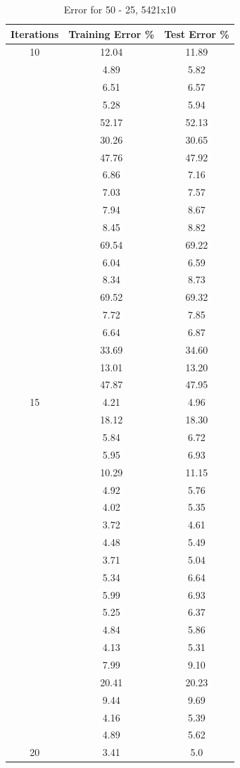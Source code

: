 \documentclass[12pt]{article}
\begin{document}
\begin{table}[h]
	\begin{center}
		\caption{Error for 50 - 25, 5421x10}
		\label{tab:table2}
		\begin{tabular}{|c|c|c|}
			\hline
			\textbf{Iterations} & \textbf{Training Error \%} & \textbf{Test Error \%} \\
			\hline
			10 & 12.04 & 11.89\\
			& 4.89 & 5.82\\
			& 6.51 & 6.57\\
			& 5.28 & 5.94\\
			& 52.17 & 52.13\\
			& 30.26 & 30.65\\
			& 47.76 & 47.92\\
			& 6.86 & 7.16\\
			& 7.03 & 7.57\\
			& 7.94 & 8.67\\
			& 8.45 & 8.82\\
			& 69.54 & 69.22\\
			& 6.04 & 6.59\\
			& 8.34 & 8.73\\
			& 69.52 & 69.32\\
			& 7.72 & 7.85\\
			& 6.64 & 6.87\\
			& 33.69 & 34.60\\
			& 13.01 & 13.20\\
			& 47.87 & 47.95\\
			\hline
			15 & 4.21 & 4.96\\
			& 18.12 & 18.30\\
			& 5.84 & 6.72\\
			& 5.95 & 6.93\\
			& 10.29 & 11.15\\
			& 4.92 & 5.76\\
			& 4.02 & 5.35\\
			& 3.72 & 4.61\\
			& 4.48 & 5.49\\
			& 3.71 & 5.04\\
			& 5.34 & 6.64\\
			& 5.99 & 6.93\\
			& 5.25 & 6.37\\
			& 4.84 & 5.86\\
			& 4.13 & 5.31\\
			& 7.99 & 9.10\\
			& 20.41 & 20.23\\
			& 9.44 & 9.69\\
			& 4.16 & 5.39\\
			& 4.89 & 5.62\\
			\hline
			20 & 3.41 & 5.0 \\
			\hline
		\end{tabular}
	\end{center}
\end{table}
\end{document}
